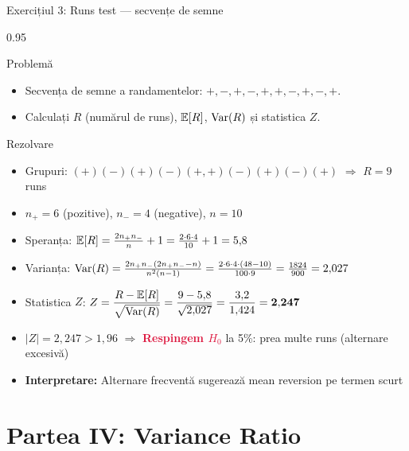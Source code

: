 \documentclass[9pt, aspectratio=169, t]{beamer}
\begin{document}
\begin{frame}[shrink=15]{Exercițiul 3: Runs test --- secvențe de semne}
\begin{cminipage}{0.95\textwidth}
\begin{block}{Problemă}
\begin{itemize}\setlength{\itemsep}{0pt}
    \item Secvența de semne a randamentelor: $+, -, +, -, +, +, -, +, -, +$.
    \item Calculați $R$ (numărul de runs), $\mathbb{E}[R]$, $\text{Var}(R)$ și statistica $Z$.
\end{itemize}
\end{block}

\begin{exampleblock}{Rezolvare}
\small
\begin{itemize}\setlength{\itemsep}{0pt}
    \item Grupuri: $(+)(-)(+)(-)(+,+)(-)(+)(-)(+)$ $\Rightarrow$ $R = 9$ runs
    \item $n_+ = 6$ (pozitive), $n_- = 4$ (negative), $n = 10$
    \item Speranța: $\mathbb{E}[R] = \frac{2 n_+ n_-}{n} + 1 = \frac{2 \cdot 6 \cdot 4}{10} + 1 = 5{,}8$
    \item Varianța: $\text{Var}(R) = \frac{2n_+n_-(2n_+n_- - n)}{n^2(n-1)} = \frac{2 \cdot 6 \cdot 4 \cdot (48-10)}{100 \cdot 9} = \frac{1824}{900} = 2{,}027$
    \item Statistica $Z$: $\displaystyle Z = \frac{R - \mathbb{E}[R]}{\sqrt{\text{Var}(R)}} = \frac{9 - 5{,}8}{\sqrt{2{,}027}} = \frac{3{,}2}{1{,}424} = \mathbf{2{,}247}$
    \item $|Z| = 2{,}247 > 1{,}96$ $\Rightarrow$ \textcolor{Crimson}{\textbf{Respingem $H_0$}} la 5\%: prea multe runs (alternare excesivă)
    \item \textbf{Interpretare:} Alternare frecventă sugerează mean reversion pe termen scurt
\end{itemize}
\end{exampleblock}
\end{cminipage}
\end{frame}

\section{Partea IV: Variance Ratio}
\end{document}
